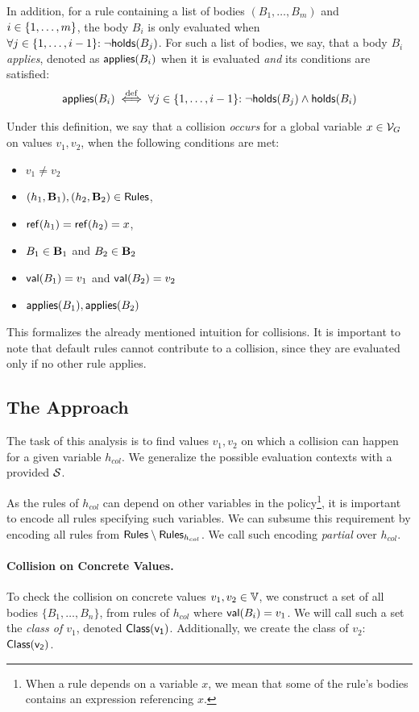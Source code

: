 In addition, for a rule containing a list of bodies $(B_1,\ldots,B_m)$ and $i \in \{1,\ldots,m\}$, the body $B_i$ is only evaluated when $\forall j \in \{1,\ldots,i-1\}{:}\; \neg\mathsf{holds}(B_j)$.
For such a list of bodies, we say, that a body $B_i$ \emph{applies}, denoted as $\mathsf{applies}(B_i)$ when it is evaluated \emph{and} its conditions are satisfied:
$$\mathsf{applies}(B_i) \overset{\mathrm{def}}{\iff} \forall j \in \{1,\ldots,i-1\}{:}\; \neg\mathsf{holds}(B_j) \land \mathsf{holds}(B_i)$$

Under this definition, we say that a collision \emph{occurs} for a global variable $x \in \mathcal{V}_G$ on values $v_1,v_2$, when the following conditions are met:
\begin{itemize}
  \item $v_1 \neq v_2$
  \item $(h_1,\mathbf{B}_1),(h_2,\mathbf{B}_2) \in \mathsf{Rules}$,
  \item $\mathsf{ref}(h_1) = \mathsf{ref}(h_2) = x$,
  \item $B_1 \in \mathbf{B}_1$ and $B_2 \in \mathbf{B}_2$
  \item $\mathsf{val}(B_1) = v_1$ and $\mathsf{val}(B_2) = v_2$
  \item $\mathsf{applies}(B_1), \mathsf{applies}(B_2)$
\end{itemize}
This formalizes the already mentioned intuition for collisions.
It is important to note that default rules cannot contribute to a collision, since they are evaluated only if no other rule applies.

\subsection{The Approach}

The task of this analysis is to find values $v_1,v_2$ on which a collision can happen for a given variable $h_{col}$.
We generalize the possible evaluation contexts with a provided $\mathcal{S}$.

As the rules of $h_{col}$ can depend on other variables in the policy\footnote{
  When a rule depends on a variable $x$, we mean that some of the rule's bodies contains an expression referencing $x$.
}, it is important to encode all rules specifying such variables.
We can subsume this requirement by encoding all rules from $\mathsf{Rules} \setminus \mathsf{Rules}_{h_{col}}$.
We call such encoding \emph{partial} over $h_{col}$.

\paragraph{Collision on Concrete Values.}
To check the collision on concrete values $v_1,v_2 \in \mathbb{V}$, we construct a set of all bodies $\{B_1,\ldots,B_n\}$, from rules of $h_{col}$ where $\mathsf{val}(B_i) = v_1$.
We will call such a set the \emph{class of $v_1$}, denoted $\mathsf{Class(v_1)}$.
Additionally, we create the class of $v_2$: $\mathsf{Class(v_2)}$.

